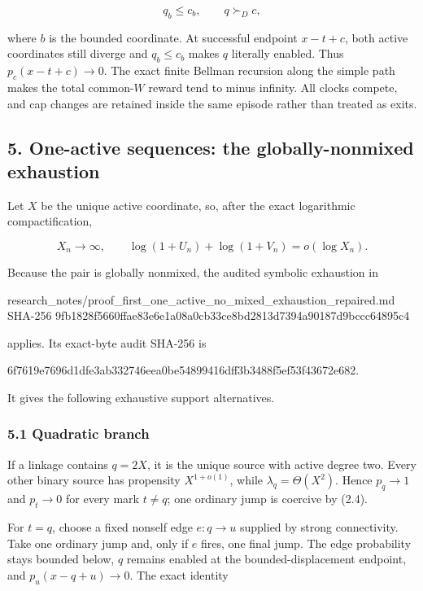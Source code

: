\[
                         q_b\le c_b,\qquad q\succ_Dc, \tag{4.1}
\]

where \(b\) is the bounded coordinate. At successful endpoint \(x-t+c\),
both active coordinates still diverge and \(q_b\le c_b\) makes \(q\)
literally enabled. Thus \(p_c(x-t+c)\to0\). The exact finite Bellman
recursion along the simple path makes the total common-\(W\) reward tend
to minus infinity. All clocks compete, and cap changes are retained
inside the same episode rather than treated as exits.

\subsection{5. One-active sequences: the globally-nonmixed
exhaustion}

Let \(X\) be the unique active coordinate, so, after the exact
logarithmic compactification,

\[
 X_n\longrightarrow\infty,\qquad
 \log(1+U_n)+\log(1+V_n)=o(\log X_n).                \tag{5.1}
\]

Because the pair is globally nonmixed, the audited symbolic exhaustion
in

\begin{CodeBlock}
research_notes/proof_first_one_active_no_mixed_exhaustion_repaired.md
SHA-256 9fb1828f5660ffae83e6e1a08a0cb33ce8bd2813d7394a90187d9bccc64895c4
\end{CodeBlock}

applies. Its exact-byte audit SHA-256 is

\begin{CodeBlock}
6f7619e7696d1dfe3ab332746eea0be54899416dff3b3488f5ef53f43672e682.
\end{CodeBlock}

It gives the following exhaustive support alternatives.

\subsubsection{5.1 Quadratic branch}

If a linkage contains \(q=2X\), it is the unique source with active
degree two. Every other binary source has propensity \(X^{1+o(1)}\),
while \(\lambda_q=\Theta(X^2)\). Hence \(p_q\to1\) and \(p_t\to0\) for
every mark \(t\ne q\); one ordinary jump is coercive by (2.4).

For \(t=q\), choose a fixed nonself edge \(e:q\to u\) supplied by strong
connectivity. Take one ordinary jump and, only if \(e\) fires, one final
jump. The edge probability stays bounded below, \(q\) remains enabled at
the bounded-displacement endpoint, and \(p_u(x-q+u)\to0\). The exact
identity

